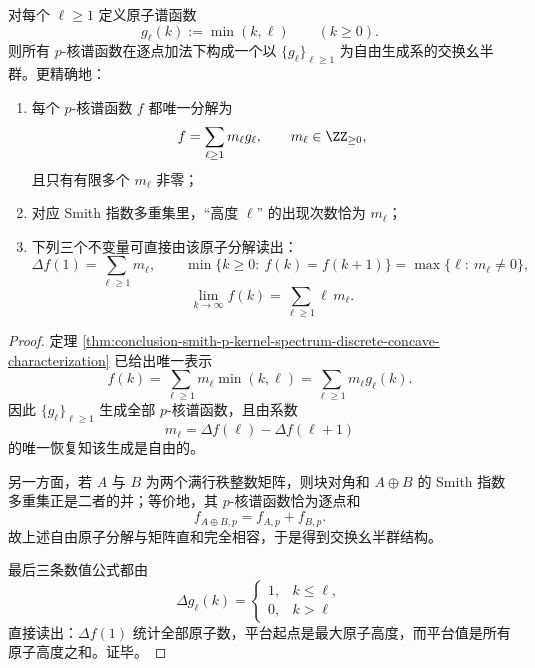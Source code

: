 \begin{corollary}\label{cor:conclusion-smith-p-kernel-spectrum-free-commutative-monoid}
对每个 \(\ell\ge 1\) 定义原子谱函数
\[
g_\ell(k):=\min(k,\ell)
\qquad(k\ge 0).
\]
则所有 \(p\)-核谱函数在逐点加法下构成一个以 \(\{g_\ell\}_{\ell\ge 1}\) 为自由生成系的交换幺半群。更精确地：
\begin{enumerate}
  \item 每个 \(p\)-核谱函数 \(f\) 都唯一分解为
  \[
  f=\sum_{\ell\ge 1}m_\ell g_\ell,
  \qquad
  m_\ell\in \ZZ_{\ge 0},
  \]
  且只有有限多个 \(m_\ell\) 非零；
  \item 对应 Smith 指数多重集里，“高度 \(\ell\)” 的出现次数恰为 \(m_\ell\)；
  \item 下列三个不变量可直接由该原子分解读出：
  \[
  \Delta f(1)=\sum_{\ell\ge 1}m_\ell,
  \qquad
  \min\{k\ge 0:\ f(k)=f(k+1)\}=\max\{\ell:\ m_\ell\neq 0\},
  \]
  \[
  \lim_{k\to\infty}f(k)=\sum_{\ell\ge 1}\ell\,m_\ell.
  \]
\end{enumerate}
\end{corollary}
\begin{proof}
定理 \ref{thm:conclusion-smith-p-kernel-spectrum-discrete-concave-characterization} 已给出唯一表示
\[
f(k)=\sum_{\ell\ge 1}m_\ell\min(k,\ell)=\sum_{\ell\ge 1}m_\ell g_\ell(k).
\]
因此 \(\{g_\ell\}_{\ell\ge 1}\) 生成全部 \(p\)-核谱函数，且由系数
\[
m_\ell=\Delta f(\ell)-\Delta f(\ell+1)
\]
的唯一恢复知该生成是自由的。

另一方面，若 \(A\) 与 \(B\) 为两个满行秩整数矩阵，则块对角和 \(A\oplus B\) 的 Smith 指数多重集正是二者的并；等价地，其 \(p\)-核谱函数恰为逐点和
\[
f_{A\oplus B,p}=f_{A,p}+f_{B,p}.
\]
故上述自由原子分解与矩阵直和完全相容，于是得到交换幺半群结构。

最后三条数值公式都由
\[
\Delta g_\ell(k)=
\begin{cases}
1,& k\le \ell,\\
0,& k>\ell
\end{cases}
\]
直接读出：\(\Delta f(1)\) 统计全部原子数，平台起点是最大原子高度，而平台值是所有原子高度之和。证毕。
\end{proof}

